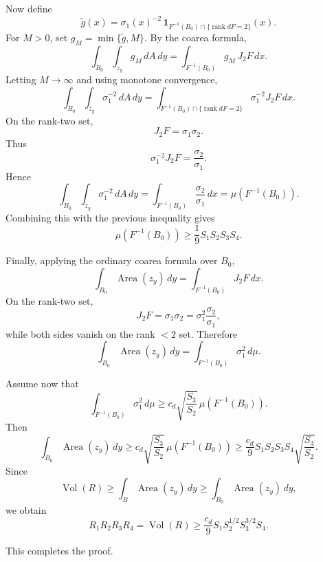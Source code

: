 Now define
\[
\widetilde g(x)
=
\sigma_1(x)^{-2}\,
\mathbf 1_{F^{-1}(B_0)\cap\{\operatorname{rank}dF=2\}}(x).
\]
For \(M>0\), set \(g_M=\min\{\widetilde g,M\}\). By the coarea formula,
\[
\int_{B_0}\int_{z_y} g_M\,dA\,dy
=
\int_{F^{-1}(B_0)}g_M\,J_2F\,dx.
\]
Letting \(M\to\infty\) and using monotone convergence,
\[
\int_{B_0}\int_{z_y}\sigma_1^{-2}\,dA\,dy
=
\int_{F^{-1}(B_0)\cap\{\operatorname{rank}dF=2\}}
\sigma_1^{-2}J_2F\,dx.
\]
On the rank-two set,
\[
J_2F=\sigma_1\sigma_2.
\]
Thus
\[
\sigma_1^{-2}J_2F
=
\frac{\sigma_2}{\sigma_1}.
\]
Hence
\[
\int_{B_0}\int_{z_y}\sigma_1^{-2}\,dA\,dy
=
\int_{F^{-1}(B_0)}\frac{\sigma_2}{\sigma_1}\,dx
=
\mu(F^{-1}(B_0)).
\]
Combining this with the previous inequality gives
\[
\mu(F^{-1}(B_0))
\ge
\frac19 S_1S_2S_3S_4.
\]

Finally, applying the ordinary coarea formula over \(B_0\),
\[
\int_{B_0}\operatorname{Area}(z_y)\,dy
=
\int_{F^{-1}(B_0)}J_2F\,dx.
\]
On the rank-two set,
\[
J_2F=\sigma_1\sigma_2
=
\sigma_1^2\frac{\sigma_2}{\sigma_1},
\]
while both sides vanish on the rank \(<2\) set. Therefore
\[
\int_{B_0}\operatorname{Area}(z_y)\,dy
=
\int_{F^{-1}(B_0)}\sigma_1^2\,d\mu.
\]

Assume now that
\[
\int_{F^{-1}(B_0)}\sigma_1^2\,d\mu
\ge
c_d\sqrt{\frac{S_3}{S_2}}\,
\mu(F^{-1}(B_0)).
\]
Then
\[
\int_{B_0}\operatorname{Area}(z_y)\,dy
\ge
c_d\sqrt{\frac{S_3}{S_2}}\,
\mu(F^{-1}(B_0))
\ge
\frac{c_d}{9}
S_1S_2S_3S_4
\sqrt{\frac{S_3}{S_2}}.
\]
Since
\[
\operatorname{Vol}(R)
\ge
\int_B\operatorname{Area}(z_y)\,dy
\ge
\int_{B_0}\operatorname{Area}(z_y)\,dy,
\]
we obtain
\[
R_1R_2R_3R_4
=
\operatorname{Vol}(R)
\ge
\frac{c_d}{9}
S_1S_2^{1/2}S_3^{3/2}S_4.
\]

This completes the proof.